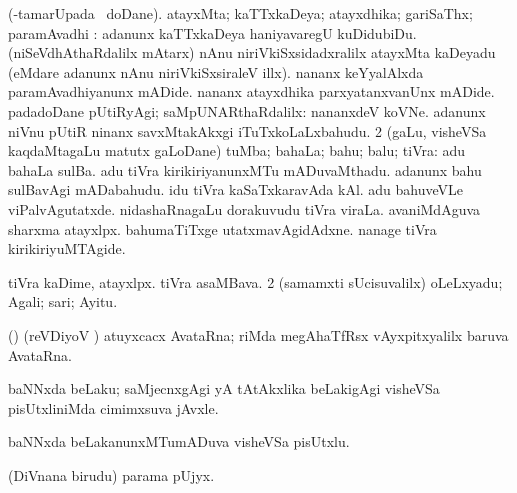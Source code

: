 {{{{\bentry
{} 
\gl{\kirxvi}
\expl{}
\bmng
\bnum
{} (-tamarUpada \gu\ doDane). 
\banum
{} atayxMta; kaTTxkaDeya; atayxdhika; gariSaThx; paramAvadhi :  adanunx kaTTxkaDeya haniyavaregU kuDidubiDu.  (niSeVdhAthaRdalilx mAtarx) nAnu niriVkiSxsidadxralilx atayxMta kaDeyadu (eMdare adanunx nAnu niriVkiSxsiraleV illx).  nananx keYyalAlxda paramAvadhiyanunx mADide.  nananx atayxdhika parxyatanxvanUnx mADide. 
  padadoDane\eng{} pUtiRyAgi; saMpUNARthaRdalilx:  nananxdeV koVNe.  adanunx niVnu pUtiR ninanx savxMtakAkxgi iTuTxkoLaLxbahudu. 
\eanum
\numie
\num{2} (\gu gaLu, visheVSa kaqdaMtagaLu matutx \kirxvi gaLoDane) tuMba; bahaLa; bahu; balu; tiVra:  adu bahaLa sulBa.  adu tiVra kirikiriyanunxMTu mADuvaMthadu.  adanunx bahu sulBavAgi mADabahudu.  idu tiVra kaSaTxkaravAda kAl.  adu bahuveVLe viPalvAgutatxde.  nidashaRnagaLu dorakuvudu tiVra viraLa.  avaniMdAguva sharxma atayxlpx.  bahumaTiTxge utatxmavAgidAdxne.  nanage tiVra kirikiriyuMTAgide. 
\enum
\emng

\noindent 
\gl{\pagu}
\expl{}
\bmng
{} 
\bnum
{}  
\banum
{} tiVra kaDime, atayxlpx. 
 tiVra asaMBava. 
\eanum
\numie
\num{2}  (samamxti sUcisuvalilx) oLeLxyadu; Agali; sari; Ayitu. 
\enum
\emng
\eentry

\bentry
{}
\gl{\nA}
\expl{}
\bmng
 (\Bwvi) (reVDiyoV \vi) atuyxcacx AvataRna; riMda  megAhaTfRsx vAyxpitxyalilx baruva AvataRna. 
\emng
\eentry

\bentry
{} 
\gl{\nA}
\expl{}
\bmng
 baNNxda beLaku; saMjecnxgAgi yA tAtAkxlika beLakigAgi visheVSa pisUtxliniMda cimimxsuva jAvxle. 
\emng
\eentry

\bentry
{} 
\gl{\nA}
\expl{}
\bmng
 baNNxda beLakanunxMTumADuva visheVSa pisUtxlu. 
\emng
\eentry

\bentry
{}
\gl{\gu}
\expl{}
\bmng
 (DiVnana birudu) parama pUjyx. 
\emng
\eentry

}}}}
